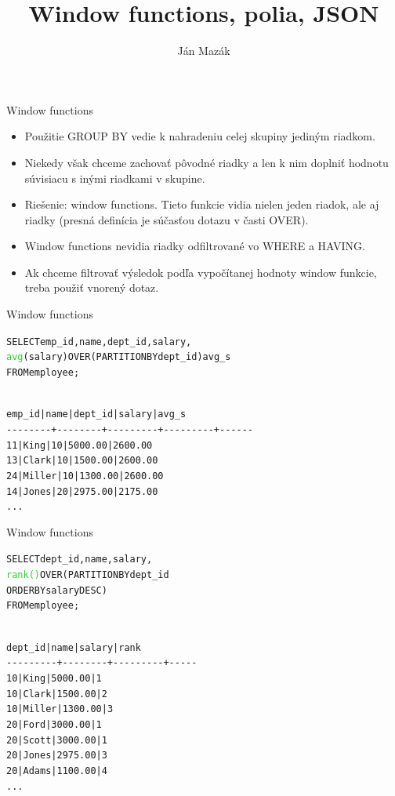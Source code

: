 \documentclass[12pt]{beamer}
\title{Window functions, polia, JSON}
\author{Ján Mazák}
\institute{FMFI UK Bratislava}
\date{}
\def\blue#1{\textcolor{Cerulean}{#1}}
\def\green#1{\textcolor{LimeGreen}{#1}}
\begin{document}
\frame{\titlepage}

\begin{frame}[fragile]{Window functions}
\begin{itemize}
\item Použitie GROUP BY vedie k nahradeniu celej skupiny jediným riadkom.
\item Niekedy však chceme zachovať pôvodné riadky a len k nim doplniť hodnotu súvisiacu s inými riadkami v skupine.
\item Riešenie: \alert{window functions}. Tieto funkcie vidia nielen jeden riadok, ale aj  riadky
    (presná definícia je súčasťou dotazu v časti \alert{OVER}).
\item Window functions nevidia riadky odfiltrované vo WHERE a HAVING.
\item Ak chceme filtrovať výsledok podľa vypočítanej hodnoty window funkcie, treba použiť vnorený dotaz.
\end{itemize}
\end{frame}

\begin{frame}[fragile]{Window functions}
\small
\begin{alltt}
SELECT emp_id, name, dept_id, salary,
       \green{avg}(salary) \alert{OVER (PARTITION BY dept_id)} avg_s
FROM employee;
\end{alltt}
\begin{alltt}
\blue{
 emp_id | name   | dept_id | salary  | avg_s
-{}-{}-{}-{}-{}-{}-{}-{}+-{}-{}-{}-{}-{}-{}-{}-{}+-{}-{}-{}-{}-{}-{}-{}-{}-{}+-{}-{}-{}-{}-{}-{}-{}-{}-{}+-{}-{}-{}-{}-{}-{}
     11 | King   |      10 | 5000.00 | 2600.00
     13 | Clark  |      10 | 1500.00 | 2600.00
     24 | Miller |      10 | 1300.00 | 2600.00
     14 | Jones  |      20 | 2975.00 | 2175.00
     ...
}
\end{alltt}
\end{frame}

\begin{frame}[fragile]{Window functions}
\footnotesize
\begin{alltt}
SELECT dept_id, name, salary,
       \green{rank()} \alert{OVER (PARTITION BY dept_id
                    ORDER BY salary DESC)}
FROM employee;
\end{alltt}
\begin{alltt}
\blue{
 dept_id |  name  | salary  | rank
-{}-{}-{}-{}-{}-{}-{}-{}-{}+-{}-{}-{}-{}-{}-{}-{}-{}+-{}-{}-{}-{}-{}-{}-{}-{}-{}+-{}-{}-{}-{}-{}
      10 | King   | 5000.00 |    1
      10 | Clark  | 1500.00 |    2
      10 | Miller | 1300.00 |    3
      20 | Ford   | 3000.00 |    1
      20 | Scott  | 3000.00 |    1
      20 | Jones  | 2975.00 |    3
      20 | Adams  | 1100.00 |    4
    ...
}
\end{alltt}
\end{frame}
\end{document}
